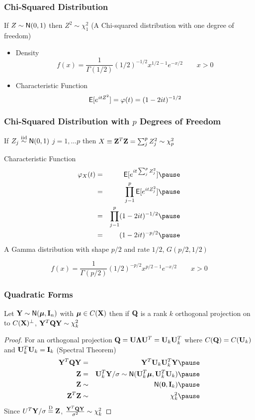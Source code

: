 \documentclass[handout]{beamer}
\begin{document}
\begin{frame}
  \frametitle{Chi-Squared Distribution}
  \begin{Definition}
    If $Z \sim \textsf{N}(0,1)$ then $Z^2 \sim \chi^2_1$ (A Chi-squared
    distribution with one degree of freedom) \pause
    \begin{itemize}
    \item Density
$$
f(x) = \frac{1}{\Gamma(1/2)} (1/2)^{-1/2} x^{1/2 - 1} e^{-x/2} \qquad x
> 0
$$ \pause
  \item  Characteristic Function
$$
\textsf{E}[e^{itZ^2}] = \varphi(t) = (1 - 2 i t)^{-1/2}
$$
  \end{itemize}

\end{Definition}
\end{frame}

\begin{frame}
  \frametitle{Chi-Squared Distribution with $p$ Degrees of Freedom}
If $Z_j \mathrel{\mathop{\sim}\limits^{\rm iid}} \textsf{N}(0,1)$ $j = 1, \ldots p$ then $X \equiv \mathbf{Z}^T\mathbf{Z} = \sum_j^p
Z_j^2 \sim \chi^2_p$  \pause

\begin{block}{Characteristic Function}
\begin{eqnarray*}
  \varphi_{X}(t) & = & \E[e^{it \sum_j^p
Z_j^2}] \pause \\
& = & \prod_{j-1}^p \E[e^{it Z_j^2 }] \pause \\
& = &  \prod_{j-1}^p (1 - 2 i t)^{-1/2} \pause \\
& = & (1 - 2 i t)^{-p/2} \pause
\end{eqnarray*}
A  Gamma distribution with shape $p/2$ and rate $1/2$, $G(p/2, 1/2)$ 

$$
f(x) = \frac{1}{\Gamma(p/2)} (1/2)^{-p/2} x^{p/2 - 1} e^{-x/2} \qquad x
> 0
$$
 \end{block}
\end{frame}
\begin{frame}
  \frametitle{Quadratic Forms}
  \begin{theorem}
  Let  $\mathbf{Y} \sim  \textsf{N}(\boldsymbol{\mu}, \mathbf{I}_n)$ with $\boldsymbol{\mu} \in C(\mathbf{X})$ then if $\mathbf{Q}$ is
  a rank $k$ orthogonal  projection on to $C(\mathbf{X})^{\perp}$,
$\mathbf{Y}^T \mathbf{Q} \mathbf{Y} \sim \chi^2_k$
  \end{theorem}
  \begin{proof}
    For an orthogonal projection  $\mathbf{Q} = \mathbf{U} \boldsymbol{\Lambda} \mathbf{U}^T 
    = \mathbf{U}_k \mathbf{U}_k^T$ where $C(\mathbf{Q}) = C(\mathbf{U}_k)$ and $\mathbf{U}_k^T\mathbf{U}_k = \mathbf{I}_k$
    (Spectral Theorem) \pause
    \begin{eqnarray*}
\Y^T\Q \Y  &=& \Y^T\U_k \U_k^T \Y      \pause \\
\Z & =  &\U_k^T \Y/ \sigma  \sim \N(\U_k^T\mub, \U_k^T\U_k) \pause \\
\Z & \sim & \N(\zero, \I_k) \pause \\
\Z^T\Z & \sim & \chi^2_k \pause 
    \end{eqnarray*}
Since $U^T\mathbf{Y} /\sigma \mathrel{\mathop{=}\limits^{\rm D}} \mathbf{Z}$, $\frac{\mathbf{Y}^T\mathbf{Q} \mathbf{Y}}{\sigma^2} \sim
\chi^2_k$


  \end{proof}
\end{frame}
\end{document}
